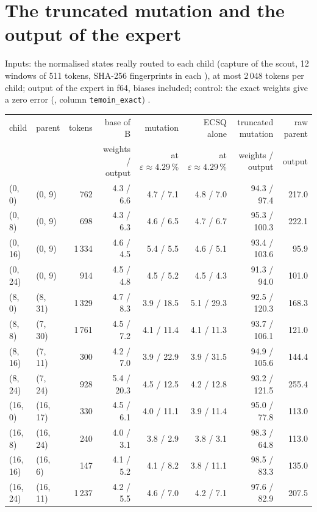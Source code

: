 \section{The truncated mutation and the output of the expert}\label{t3dup:sec:sortie}

Inputs: the normalised states really routed to each child (capture of the scout, 12 windows of 511 tokens, SHA-256 fingerprints in each ), at most 2\,048 tokens per child; output of the expert in f64, biases included; control: the exact weights give a zero error (, column \texttt{temoin\_exact}) \mes.

\begin{table}[tbp]
\centering\footnotesize
\begin{tabular}{l l r r r r r r}
\toprule
child & parent & tokens & base of B & mutation & ECSQ alone & truncated mutation & raw parent \\
& & & weights / output & at $\varepsilon \approx 4.29\,\%$ & at $\varepsilon \approx 4.29\,\%$ & weights / output & output \\
\midrule
(0, 0) & (0, 9) & 762 & 4.3 / 6.6 & 4.7 / 7.1 & 4.8 / 7.0 & 94.3 / 97.4 & 217.0 \\
(0, 8) & (0, 9) & 698 & 4.3 / 6.3 & 4.6 / 6.5 & 4.7 / 6.7 & 95.3 / 100.3 & 222.1 \\
(0, 16) & (0, 9) & 1\,334 & 4.6 / 4.5 & 5.4 / 5.5 & 4.6 / 5.1 & 93.4 / 103.6 & 95.9 \\
(0, 24) & (0, 9) & 914 & 4.5 / 4.8 & 4.5 / 5.2 & 4.5 / 4.3 & 91.3 / 94.0 & 101.0 \\
(8, 0) & (8, 31) & 1\,329 & 4.7 / 8.3 & 3.9 / 18.5 & 5.1 / 29.3 & 92.5 / 120.3 & 168.3 \\
(8, 8) & (7, 30) & 1\,761 & 4.5 / 7.2 & 4.1 / 11.4 & 4.1 / 11.3 & 93.7 / 106.1 & 121.0 \\
(8, 16) & (7, 11) & 300 & 4.2 / 7.0 & 3.9 / 22.9 & 3.9 / 31.5 & 94.9 / 105.6 & 144.4 \\
(8, 24) & (7, 24) & 928 & 5.4 / 20.3 & 4.5 / 12.5 & 4.2 / 12.8 & 93.2 / 121.5 & 255.4 \\
(16, 0) & (16, 17) & 330 & 4.5 / 6.1 & 4.0 / 11.1 & 3.9 / 11.4 & 95.0 / 77.8 & 113.0 \\
(16, 8) & (16, 24) & 240 & 4.0 / 3.1 & 3.8 / 2.9 & 3.8 / 3.1 & 98.3 / 64.8 & 113.0 \\
(16, 16) & (16, 6) & 147 & 4.1 / 5.2 & 4.1 / 8.2 & 3.8 / 11.1 & 98.5 / 83.3 & 135.0 \\
(16, 24) & (16, 11) & 1\,237 & 4.2 / 5.5 & 4.6 / 7.0 & 4.2 / 7.1 & 97.6 / 82.9 & 207.5 \\

\end{tabular}
\end{table}
